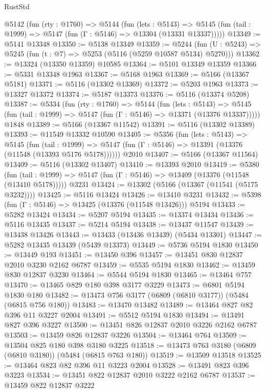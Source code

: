 \begin{lexlean}{RustStd}
\begin{coremodule}
  @5142
    (fun (rty : @1760) =>
    @5144
      (fun (lets : @5143) =>
      @5145 (fun (tail : @1999) => @5147 (fun (Γ : @5146) => @13304 (@13331 @13337)))))
@13349 := @5141 @13348
@13350 := @5138 @13349
@13359 := @5244
    (fun (U : @5243) => @5245 (fun (t : @7) => @5253 (@5116 (@5259 @10587 @5134) @5270)))
@13362 := @13324 (@13350 @13359) @10585
@13364 := @5101 @13349 @13359
@13366 := @5331 @13348 @1963
@13367 := @5168 @1963
@13369 := @5166 (@13367 @5181)
@13371 := @5116 (@13302 @13369)
@13372 := @5203 @1963
@13373 := @13327 @13372
@13374 := @5187 @13373
@13376 := @5116 (@13374 @5208)
@13387 := @5334
    (fun (rty : @1760) =>
    @5144
      (fun (lets : @5143) =>
      @5145 (fun (tail : @1999) => @5147 (fun (Γ : @5146) => @13371 (@13376 @13337)))))
    @1848
@13389 := @5166 (@13367 @11542)
@13391 := @5116 (@13302 @13389)
@13393 := @11549 @13332 @10590
@13405 := @5356
    (fun (lets : @5143) =>
    @5145
      (fun (tail : @1999) =>
      @5147 (fun (Γ : @5146) => @13391 (@13376 (@11548 (@13393 @5176 @5178))))))
    @2010
@13407 := @5166 (@13367 @11564)
@13409 := @5116 (@13302 @13407)
@13410 := @13393 @2010
@13419 := @5380
    (fun (tail : @1999) => @5147 (fun (Γ : @5146) => @13409 (@13376 (@11548 (@13410 @5178)))))
    @3231
@13424 := @13302 (@5166 (@13367 (@11541 (@5175 @3232))))
@13425 := @5116 @13424
@13426 := @13410 @3231
@13432 := @5398 (fun (Γ : @5146) => @13425 (@13376 (@11548 @13426))) @5194
@13433 := @5282 @13424
@13434 := @5207 @5194
@13435 := @13374 @13434
@13436 := @5116 @13435
@13437 := @5214 @5194
@13438 := @13437 @11547
@13439 := @13438 @13426
@13443 := @13433 (@13436 @13439) (@5434 @13301)
@13447 := @5282 @13435 @13439 (@5439 @13373)
@13449 := @5736 @5194 @1830
@13450 := @13449 @193
@13451 := @13450 @396
@13457 := @13451 @830 @12837 @2010 @3230 @2162 @6787
@13459 := @5535 @5194 @1830
@13462 := @13459 @830 @12837 @3230
@13464 := @5544 @5194 @1830
@13465 := @13464 @757
@13470 := @13465 @829 @180 @398 @3177 @3229
@13473 := @6801 @5194 @1830 @180
@13482 := @13473 @756 @3177 (@6809 (@6810 @3177)) (@5484 (@6815 @756 @180))
@13483 := @13470 @13482
@13489 := @13464 @827 @82 @396 @11 @3227 @2004
@13491 := @5512 @5194 @1830
@13494 := @13491 @827 @396 @3227
@13500 := @13451 @826 @12837 @2010 @3226 @2162 @6787
@13503 := @13459 @826 @12837 @3226
@13504 := @13464 @764
@13509 := @13504 @825 @180 @398 @3180 @3225
@13518 := @13473 @763 @3180 (@6809 (@6810 @3180)) (@5484 (@6815 @763 @180))
@13519 := @13509 @13518
@13525 := @13464 @823 @82 @396 @11 @3223 @2004
@13528 := @13491 @823 @396 @3223
@13534 := @13451 @822 @12837 @2010 @3222 @2162 @6787
@13537 := @13459 @822 @12837 @3222

\end{coremodule}
\end{lexlean}
